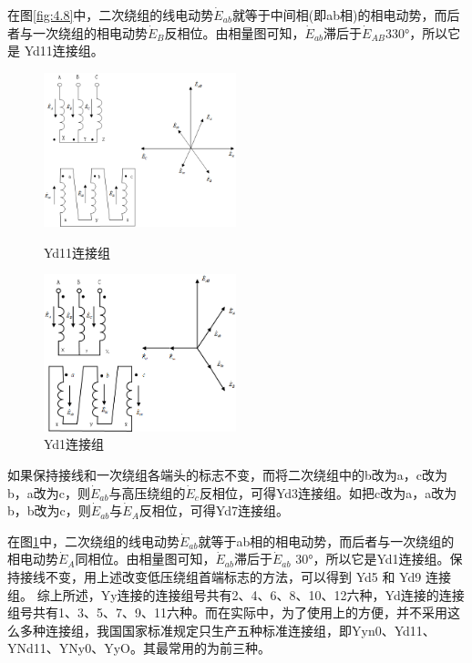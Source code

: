 \documentclass{book}
\begin{document}
在图\ref{fig:4.8}中，二次绕组的线电动势${{\dot{E}}_{ab}}$就等于中间相(即ab相)的相电动势，而后者与一次绕组的相电动势${{\dot{E}}_{B}}$反相位。由相量图可知，${{\dot{E}}_{ab}}$滞后于${{\dot{E}}_{AB}}$330°，所以它是 Yd11连接组。
\begin{figure}  %
	\begin{minipage}[H]{0.45\linewidth}  
		\centering  
		\includegraphics[width=2.2in]{4-8g.png}  
		\caption{Yd11连接组}  
		\label{fig:4.8}  
	\end{minipage}
	\begin{minipage}[H]{0.45\linewidth}  
		\centering  
		\includegraphics[width=2.2in]{4-9g.png}  
		\caption{Yd1连接组}  
		\label{fig:4.9}  
	\end{minipage}  
\end{figure}

如果保持接线和一次绕组各端头的标志不变，而将二次绕组中的b改为a，c改为b，a改为c，则${{\dot{E}}_{ab}}$与高压绕组的${{\dot{E}}_{c}}$反相位，可得Yd3连接组。如把c改为a，a改为b，b改为c，则${{\dot{E}}_{ab}}$与${{\dot{E}}_{A}}$反相位，可得Yd7连接组。

在图\ref{fig:4.9}中，二次绕组的线电动势${{\dot{E}}_{ab}}$就等于ab相的相电动势，而后者与一次绕组的相电动势${{\dot{E}}_{A}}$同相位。由相量图可知，${{\dot{E}}_{ab}}$滞后于${{\dot{E}}_{ab}}$ 30°，所以它是Yd1连接组。保持接线不变，用上述改变低压绕组首端标志的方法，可以得到 Yd5 和 Yd9 连接组。
综上所述，Yy连接的连接组号共有2、4、6、8、10、12六种，Yd连接的连接组号共有1、3、5、7、9、11六种。而在实际中，为了使用上的方便，并不采用这么多种连接组，我国国家标准规定只生产五种标准连接组，即Yyn0、Yd11、YNd11、YNy0、YyO。其最常用的为前三种。
\end{document}
